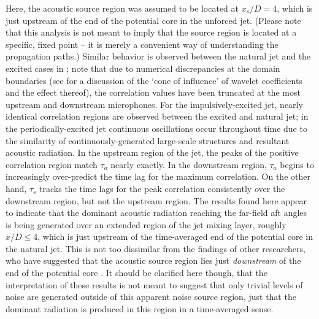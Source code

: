Here, the acoustic source region was assumed to be located at $x_s /D = 4$, which is just upstream of the end of the potential core in the unforced jet. 
(Please note that this analysis is not meant to imply that the source region is located at a specific, fixed point – it is merely a convenient way of understanding the propagation paths.)
Similar behavior is observed between the natural jet and the excited cases in ; note that due to numerical discrepancies at the domain boundaries (see \citet{Torrence1998} for a discussion of the `cone of influence' of wavelet coefficients and the effect thereof), the correlation values have been truncated at the most upstream and downstream microphones.
For the impulsively-excited jet, nearly identical correlation regions are observed between the excited and natural jet; in the periodically-excited jet continuous oscillations occur throughout time due to the similarity of continuously-generated large-scale structures and resultant acoustic radiation.
In the upstream region of the jet, the peaks of the positive correlation region match $\tau_a$ nearly exactly. 
In the downstream region, $\tau_a$ begins to increasingly over-predict the time lag for the maximum correlation. 
On the other hand, $\tau_s$ tracks the time lags for the peak correlation consistently over the downstream region, but not the upstream region. 
The results found here appear to indicate that the dominant acoustic radiation reaching the far-field aft angles is being generated over an extended region of the jet mixing layer, roughly $x/D \leq 4$, which is just upstream of the time-averaged end of the potential core in the natural jet.
This is not too dissimilar from the findings of other researchers, who have suggested that the acoustic source region lies just \textit{downstream} of the end of the potential core \citep{Hileman2005}.
It should be clarified here though, that the interpretation of these results is not meant to suggest that only trivial levels of noise are generated outside of this apparent noise source region, just that the dominant radiation is produced in this region in a time-averaged sense.
